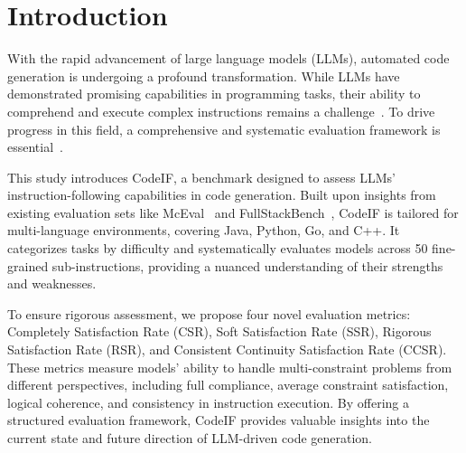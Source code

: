 \section{Introduction}





With the rapid advancement of large language models (LLMs), automated code generation is undergoing a profound transformation. While LLMs have demonstrated promising capabilities in programming tasks, their ability to comprehend and execute complex instructions remains a challenge~\cite{liu2024fullstackbenchevaluatingllms, zhang2023repocoder}. To drive progress in this field, a comprehensive and systematic evaluation framework is essential~\cite{jiang2024followbenchmultilevelfinegrainedconstraints, zhou2023instructionfollowingevaluationlargelanguage}.

This study introduces CodeIF, a benchmark designed to assess LLMs’ instruction-following capabilities in code generation. Built upon insights from existing evaluation sets like McEval~\cite{mceval} and FullStackBench~\cite{liu2024fullstackbenchevaluatingllms}, CodeIF is tailored for multi-language environments, covering Java, Python, Go, and C++. It categorizes tasks by difficulty and systematically evaluates models across 50 fine-grained sub-instructions, providing a nuanced understanding of their strengths and weaknesses.

To ensure rigorous assessment, we propose four novel evaluation metrics: Completely Satisfaction Rate (CSR), Soft Satisfaction Rate (SSR), Rigorous Satisfaction Rate (RSR), and Consistent Continuity Satisfaction Rate (CCSR). These metrics measure models' ability to handle multi-constraint problems from different perspectives, including full compliance, average constraint satisfaction, logical coherence, and consistency in instruction execution. By offering a structured evaluation framework, CodeIF provides valuable insights into the current state and future direction of LLM-driven code generation.

